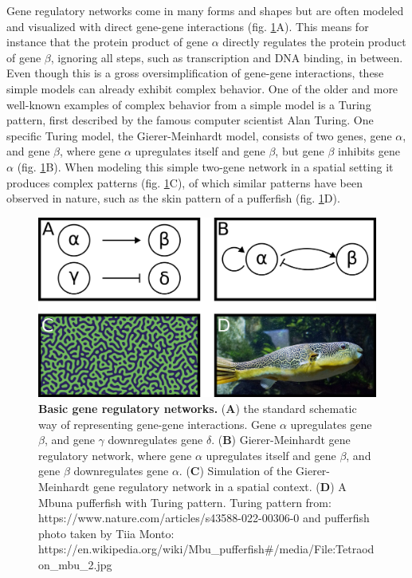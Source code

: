 Gene regulatory networks come in many forms and shapes but are often modeled and visualized with direct gene-gene interactions (fig. \ref{fig:network}A). This means for instance that the protein product of gene $\alpha$ directly regulates the protein product of gene $\beta$, ignoring all steps, such as transcription and DNA binding, in between. Even though this is a gross oversimplification of gene-gene interactions, these simple models can already exhibit complex behavior. One of the older and more well-known examples of complex behavior from a simple model is a Turing pattern, first described by the famous computer scientist Alan Turing\cite{Turing1952}. One specific Turing model, the Gierer-Meinhardt model, consists of two genes, gene $\alpha$, and gene $\beta$, where gene $\alpha$ upregulates itself and gene $\beta$, but gene $\beta$ inhibits gene $\alpha$ (fig. \ref{fig:network}B). When modeling this simple two-gene network in a spatial setting it produces complex patterns (fig. \ref{fig:network}C), of which similar patterns have been observed in nature, such as the skin pattern of a pufferfish (fig. \ref{fig:network}D).

\begin{figure}[H]
    \center
    \includegraphics[width=0.8\linewidth]{ch.introduction/imgs/network.png}
    \caption{\textbf{Basic gene regulatory networks.} (\textbf{A}) the standard schematic way of representing gene-gene interactions. Gene $\alpha$ upregulates gene $\beta$, and gene $\gamma$ downregulates gene $\delta$. (\textbf{B}) Gierer-Meinhardt gene regulatory network, where gene $\alpha$ upregulates itself and gene $\beta$, and gene $\beta$ downregulates gene $\alpha$. (\textbf{C}) Simulation of the Gierer-Meinhardt gene regulatory network in a spatial context. (\textbf{D}) A Mbuna pufferfish with Turing pattern. Turing pattern from: https://www.nature.com/articles/s43588-022-00306-0 and pufferfish photo taken by Tiia Monto: https://en.wikipedia.org/wiki/Mbu\_pufferfish\#/media/File:Tetraodon\_mbu\_2.jpg}
    \label{fig:network}
\end{figure}

